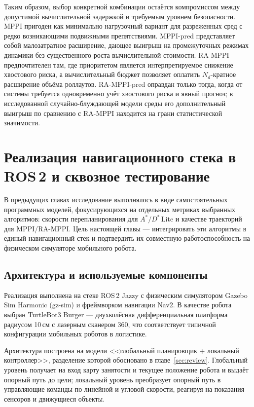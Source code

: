 \documentclass[a4paper,12pt]{extarticle}
\begin{document}
    Таким образом, выбор конкретной комбинации остаётся компромиссом между допустимой
    вычислительной задержкой и требуемым уровнем безопасности.
    MPPI пригоден как минимально нагрузочный вариант для разреженных сред с редко
    возникающими подвижными препятствиями. MPPI-pred представляет собой малозатратное
    расширение, дающее выигрыш на промежуточных режимах динамики без существенного роста
    вычислительной стоимости. RA-MPPI предпочтителен там, где приоритетом является
    интерпретируемое снижение хвостового риска, а вычислительный бюджет позволяет
    оплатить $N_d$-кратное расширение объёма роллаутов. RA-MPPI-pred оправдан только тогда,
    когда от системы требуется одновременно учёт хвостового риска и явный прогноз;
    в исследованной случайно-блуждающей модели среды его дополнительный выигрыш
    по сравнению с RA-MPPI находится на грани статистической значимости.

    \pagebreak

    \section{Реализация навигационного стека в ROS\,2 и сквозное тестирование}
    \label{sec:ros-impl}

    В предыдущих главах исследование выполнялось в виде самостоятельных программных
    моделей, фокусирующихся на отдельных метриках выбранных алгоритмов: скорости перепланирования
    для $A^*/D^*$\,Lite и качестве траекторий для MPPI/RA-MPPI\@.
    Цель настоящей главы --- интегрировать эти алгоритмы в единый навигационный стек
    и подтвердить их совместную работоспособность на физическом симуляторе мобильного робота.

    \subsection{Архитектура и используемые компоненты}

    Реализация выполнена на стеке ROS\,2 Jazzy с физическим симулятором
    Gazebo Sim Harmonic (gz-sim) и фреймворком навигации Nav2.
    В качестве робота выбран TurtleBot3 Burger --- двухколёсная дифференциальная
    платформа радиусом 10\,см с лазерным сканером 360\textdegree, что соответствует
    типичной конфигурации мобильных роботов в логистике.

    Архитектура построена на модели <<глобальный планировщик + локальный контроллер>>,
    разделение которой обосновано в главе~\ref{sec:review}.
    Глобальный уровень получает на вход карту занятости и текущее положение робота
    и выдаёт опорный путь до цели; локальный уровень преобразует опорный путь
    в управляющие команды по линейной и угловой скорости, реагируя на показания сенсоров
    и движущиеся объекты.
\end{document}
